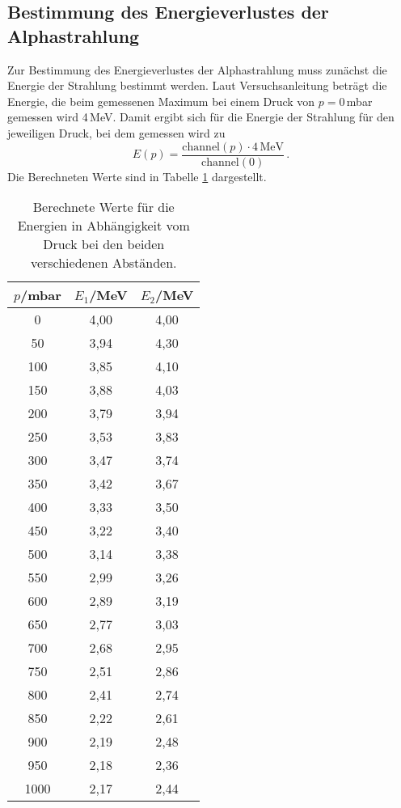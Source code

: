 \subsection{Bestimmung des Energieverlustes der Alphastrahlung}
\label{subsec:energie}

Zur Bestimmung des Energieverlustes der Alphastrahlung muss zunächst die Energie
der Strahlung bestimmt werden. Laut Versuchsanleitung \cite{Versuchsanleitung}
beträgt die Energie, die beim gemessenen Maximum bei einem Druck von $p=0\,$mbar
gemessen wird 4\,MeV. Damit ergibt sich für die Energie der Strahlung für den jeweiligen
Druck, bei dem gemessen wird zu
\begin{equation}
  E(p)=\frac{\text{channel}(p)\cdot4\,\text{MeV}}{\text{channel}(0)} \,.
\end{equation}
Die Berechneten Werte sind in Tabelle \ref{tab:energie} dargestellt.

\begin{table}[htp]
	\begin{center}
    \caption{Berechnete Werte für die Energien
    in Abhängigkeit vom Druck bei den beiden verschiedenen Abständen.}
    \label{tab:energie}
		\begin{tabular}{ccc}
		\toprule
			{$p$/mbar} & {$E_1$/MeV} & {$E_2$/MeV}\\
			\midrule
			0 & 4,00 & 4,00\\
			50 & 3,94 & 4,30\\
			100 & 3,85 & 4,10\\
			150 & 3,88 & 4,03\\
			200 & 3,79 & 3,94\\
			250 & 3,53 & 3,83\\
			300 & 3,47 & 3,74\\
			350 & 3,42 & 3,67\\
			400 & 3,33 & 3,50\\
			450 & 3,22 & 3,40\\
			500 & 3,14 & 3,38\\
			550 & 2,99 & 3,26\\
			600 & 2,89 & 3,19\\
			650 & 2,77 & 3,03\\
			700 & 2,68 & 2,95\\
			750 & 2,51 & 2,86\\
			800 & 2,41 & 2,74\\
			850 & 2,22 & 2,61\\
			900 & 2,19 & 2,48\\
			950 & 2,18 & 2,36\\
			1000 & 2,17 & 2,44\\
		\bottomrule
		\end{tabular}
	\end{center}
\end{table}

